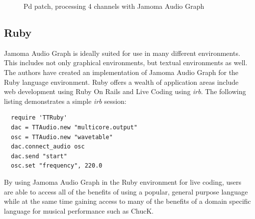 \documentclass[twoside,a4paper]{article}
\begin{document}
\begin{figure}[htbp]
\centerline{}
\caption{Pd patch, processing 4 channels with Jamoma Audio Graph}
\label{fig:pd}
\end{figure}



\subsection{Ruby} %

Jamoma Audio Graph is ideally suited for use in many different environments. 
This includes not only graphical environments, but textual environments as well.  
The authors have created an implementation of Jamoma Audio Graph for the Ruby language environment.  
Ruby offers a wealth of application areas include web development using Ruby On Rails \cite{Ruby:2009} and Live Coding \cite{Collins:2003} using \emph{irb}.  
The following listing demonstrates a simple \emph{irb} session:

\begin{lstlisting}
  require 'TTRuby'
  dac = TTAudio.new "multicore.output"
  osc = TTAudio.new "wavetable"
  dac.connect_audio osc
  dac.send "start"
  osc.set "frequency", 220.0
\end{lstlisting}

\noindent By using Jamoma Audio Graph in the Ruby environment for live coding, users are able to access all of the benefits of using a popular, general purpose language while at the same time gaining access to many of the benefits of a domain specific language for musical performance such as ChucK.

\end{document}
